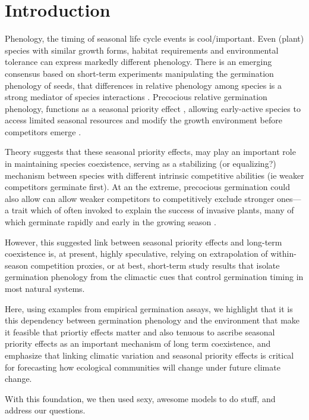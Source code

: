 \documentclass{article}[12pt]
\begin{document}


\section{Introduction}
Phenology, the timing of seasonal life cycle events is cool/important. Even (plant) species with similar growth forms, habitat requirements and environmental tolerance can express markedly different phenology.  There is an emerging consensus based on short-term experiments manipulating the germination phenology of seeds, that differences in relative phenology among species is a strong mediator of species interactions \citep{}. Precocious relative germination phenology, functions as a seasonal priority effect  \citep{Wainwright_2011, Buonaiuto2021}, allowing early-active species to access limited seasonal resources and modify the growth environment before competitors emerge \citep{Kardol2013}. 

Theory suggests that these seasonal priority effects, may play an important role in maintaining species coexistence, serving as a stabilizing (or equalizing?) mechanism between species with different intrinsic competitive abilities (ie weaker competitors germinate first). At an the extreme, precocious germination could also allow can allow weaker competitors to competitively exclude stronger ones--- a trait which of often invoked to explain the success of invasive plants, many of which germinate rapidly and early in the growing season \citep{Gioria2018,Gioria:2017wo}.

However, this suggested link between seasonal priority effects and long-term coexistence is, at present, highly speculative, relying on extrapolation of within-season competition proxies, or at best, short-term study results that isolate germination phenology from the climactic cues that control germination timing in most natural systems. 

Here, using examples from empirical germination assays, we highlight that it is this dependency between germination phenology and the environment that make it feasible that priortiy effects matter and also tenuous to ascribe seasonal priority effects as an important mechanism of long term coexistence, and emphasize that linking climatic variation and seasonal priority effects is critical for forecasting how ecological communities will change under future climate change.

With this foundation, we then used sexy, awesome models to do stuff, and address our questions.
\end{document}
